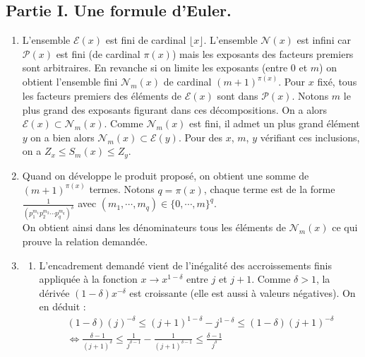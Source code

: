 \subsection*{Partie I. Une formule d'Euler.}
\begin{enumerate}
 \item L'ensemble $\mathcal E(x)$ est fini de cardinal $\lfloor x\rfloor$. L'ensemble $\mathcal N(x)$ est infini car $\mathcal P(x)$ est fini (de cardinal $\pi(x)$) mais les exposants des facteurs premiers sont arbitraires. En revanche si on limite les exposants (entre $0$ et $m$) on obtient l'ensemble fini $\mathcal N_m(x)$ de cardinal $(m+1)^{\pi(x)}$.\newline
Pour $x$ fixé, tous les facteurs premiers des éléments de $\mathcal E(x)$ sont dans $\mathcal P(x)$. Notons $m$ le plus grand des exposants figurant dans ces décompositions. On a alors $\mathcal E(x)\subset\mathcal N_m(x)$. Comme $\mathcal N_m(x)$ est fini, il admet un plus grand élément $y$ on a bien alors $\mathcal N_m(x)\subset \mathcal E(y)$. Pour des $x$, $m$, $y$ vérifiant ces inclusions, on a $ Z_x \leq S_m(x) \leq Z_y$.

\item Quand on développe le produit proposé, on obtient une somme de $(m+1)^{\pi(x)}$ termes. Notons $q=\pi(x)$, chaque terme est de la forme
 $\frac{1}{\left(p_1^{m_1}p_2^{m_2}\cdots p_q^{m_q} \right)^\delta}$
avec  $(m_1,\cdots,m_q)\in\{0,\cdots,m\}^q$.\\ On obtient ainsi dans les dénominateurs tous les éléments de $\mathcal N_m(x)$ ce qui prouve la relation demandée. 
\item \begin{enumerate}
 \item L'encadrement demandé vient de l'inégalité des accroissements finis appliquée à la fonction $x\rightarrow x^{1-\delta}$ entre $j$ et $j+1$. Comme $\delta>1$, la dérivée $(1-\delta)x^{-\delta}$ est croissante (elle est aussi à valeurs négatives). On en déduit :
\begin{multline*}
 (1-\delta)(j)^{-\delta}\leq(j+1)^{1-\delta}-j^{1-\delta}\leq (1-\delta)(j+1)^{-\delta}\\ \Leftrightarrow
 \frac{\delta -1}{(j+1)^\delta}\leq \frac{1}{j^{\delta -1}} - \frac{1}{(j+1)^{\delta -1}}\leq 
\frac{\delta -1}{j^\delta}
\end{multline*}


\end{enumerate}
\end{enumerate}
